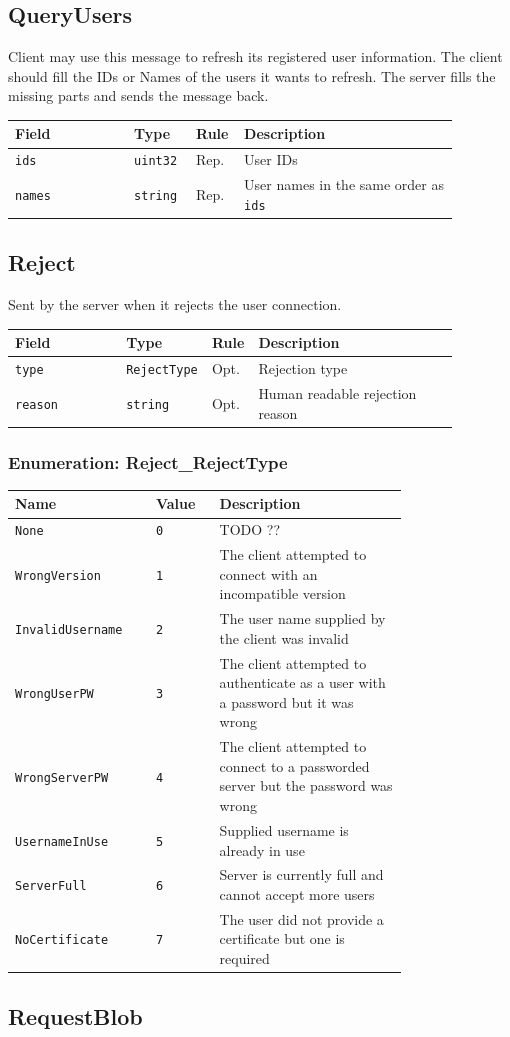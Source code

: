 \documentclass[11pt]{article} %
\newenvironment{mumbleMessageEx}
{%
	\small
	\renewcommand\arraystretch{1.5}
	\begin{tabular}{p{0.25\linewidth}p{0.13\linewidth}p{0.05\linewidth}p{0.45\linewidth}}
	Field & Type & Rule & Description \\
	\hline
}
{%
	\end{tabular}
	\renewcommand\arraystretch{1.0}
}
\newcommand{\mumbleMessageExItem}[4]{ \texttt{#1} & \texttt{#2} & #3 & #4 \\ }
\newenvironment{mumbleEnum}
{%
	\small
	\renewcommand\arraystretch{1.5}
	\begin{tabular}{p{0.25\linewidth}p{0.13\linewidth}p{0.4\linewidth}}
	Name & Value & Description \\
	\hline
}
{%
	\end{tabular}
	\renewcommand\arraystretch{1.0}
}
\newcommand{\mumbleEnumItem}[3]{ \texttt{#1} & \texttt{#2} & #3 \\ }
\begin{document}
\subsection{QueryUsers}
\label{msg:queryUsers}

Client may use this message to refresh its registered user information. The client should fill the IDs or Names of the users it wants to refresh. The server fills the missing parts and sends the message back.

\begin{mumbleMessageEx}
\mumbleMessageExItem{ids}{uint32}{Rep.}{User IDs}
\mumbleMessageExItem{names}{string}{Rep.}{User names in the same order as \texttt{ids}}
\end{mumbleMessageEx}

\subsection{Reject}
\label{msg:reject}

Sent by the server when it rejects the user connection.

\begin{mumbleMessageEx}
\mumbleMessageExItem{type}{RejectType}{Opt.}{Rejection type}
\mumbleMessageExItem{reason}{string}{Opt.}{Human readable rejection reason}
\end{mumbleMessageEx}

\subsubsection{Enumeration: Reject\_RejectType}
\label{msg:reject:rejectType}

\begin{mumbleEnum}
\mumbleEnumItem{None}{0}{TODO ??}
\mumbleEnumItem{WrongVersion}{1}{The client attempted to connect with an incompatible version}
\mumbleEnumItem{InvalidUsername}{2}{The user name supplied by the client was invalid}
\mumbleEnumItem{WrongUserPW}{3}{The client attempted to authenticate as a user with a password but it was wrong}
\mumbleEnumItem{WrongServerPW}{4}{The client attempted to connect to a passworded server but the password was wrong}
\mumbleEnumItem{UsernameInUse}{5}{Supplied username is already in use}
\mumbleEnumItem{ServerFull}{6}{Server is currently full and cannot accept more users}
\mumbleEnumItem{NoCertificate}{7}{The user did not provide a certificate but one is required}
\end{mumbleEnum}

\subsection{RequestBlob}
\label{msg:requestBlob}
\end{document}

